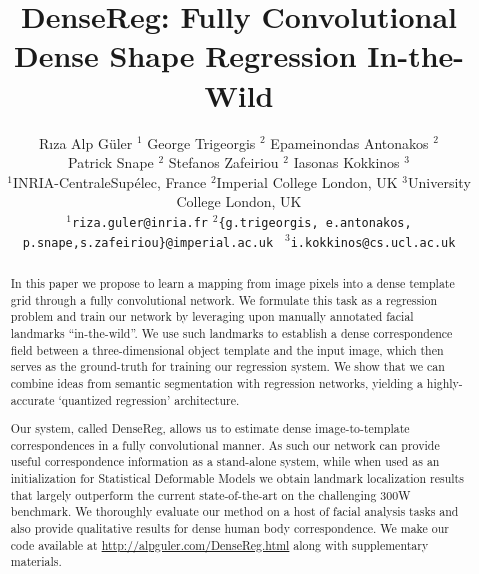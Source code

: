 \documentclass[10pt,twocolumn,letterpaper]{article}
\begin{document}
\title{DenseReg: Fully Convolutional Dense Shape Regression In-the-Wild}


\author{R{\i}za Alp G\"uler $^{1}$ \hspace{1em}
	George Trigeorgis $^{2}$ \hspace{1em}
	Epameinondas Antonakos $^{2}$\vspace{0.15em}\\
	Patrick Snape $^{2}$\hspace{1em}
    Stefanos Zafeiriou $^{2}$ \hspace{1em}
    Iasonas Kokkinos $^{3}$ \vspace{0.3em}\\
	$^1$INRIA-CentraleSup\'elec, France \hspace{1em} $^2$Imperial College London, UK  \hspace{2em} $^3$University College London, UK\\
	$^{1}${\tt\scriptsize riza.guler@inria.fr}\hspace{1em} 
	$^{2}${\tt\scriptsize\{g.trigeorgis, e.antonakos, p.snape,s.zafeiriou\}@imperial.ac.uk 	}\hspace{1em}	
	$^{3}${\tt\scriptsize i.kokkinos@cs.ucl.ac.uk}
}


\maketitle


\begin{abstract}
In this paper we propose to learn a mapping from image pixels into a dense template  grid through a fully convolutional network.  We formulate this task as a regression problem and train our network by leveraging upon manually annotated facial landmarks ``in-the-wild''. We use such landmarks to establish a dense correspondence field between a three-dimensional object template and the input image, which then serves as the ground-truth for training our regression system. We show that we can combine ideas from semantic segmentation with regression networks, yielding a highly-accurate `quantized regression' architecture.

Our system, called DenseReg, allows us to estimate dense image-to-template correspondences in a fully convolutional manner. As such our network can provide useful correspondence information  as a stand-alone system, while when used as an initialization for Statistical Deformable Models we obtain landmark localization results that largely outperform the current state-of-the-art on the challenging 300W benchmark. 
We thoroughly evaluate our method on a host of facial analysis tasks
and also provide qualitative results for dense human body correspondence. We make our code available at \url{http://alpguler.com/DenseReg.html}  along with supplementary materials.



\end{abstract}
\vspace{-0.5cm}
\end{document}
